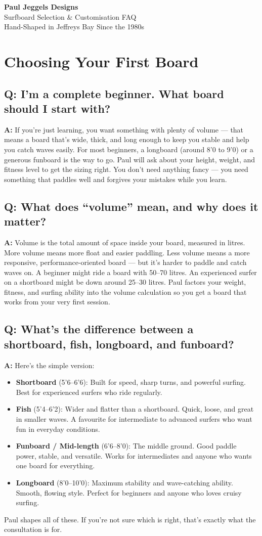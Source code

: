 \documentclass[11pt,a4paper]{article}
\newcommand{\question}[1]{\subsection*{Q: #1}}
\newcommand{\answer}{\noindent\textbf{A:} }
\begin{document}
\begin{center}
{\LARGE\bfseries\color{pjdnavy} Paul Jeggels Designs}\\[6pt]
{\Large\color{pjdnavy} Surfboard Selection \& Customisation FAQ}\\[4pt]
{\small\color{gray} Hand-Shaped in Jeffreys Bay Since the 1980s}
\end{center}

\vspace{1em}

\section{Choosing Your First Board}

\question{I'm a complete beginner. What board should I start with?}
\answer If you're just learning, you want something with plenty of volume --- that means a board that's wide, thick, and long enough to keep you stable and help you catch waves easily. For most beginners, a longboard (around 8'0 to 9'0) or a generous funboard is the way to go. Paul will ask about your height, weight, and fitness level to get the sizing right. You don't need anything fancy --- you need something that paddles well and forgives your mistakes while you learn.

\question{What does ``volume'' mean, and why does it matter?}
\answer Volume is the total amount of space inside your board, measured in litres. More volume means more float and easier paddling. Less volume means a more responsive, performance-oriented board --- but it's harder to paddle and catch waves on. A beginner might ride a board with 50--70 litres. An experienced surfer on a shortboard might be down around 25--30 litres. Paul factors your weight, fitness, and surfing ability into the volume calculation so you get a board that works from your very first session.

\question{What's the difference between a shortboard, fish, longboard, and funboard?}
\answer Here's the simple version:
\begin{itemize}[leftmargin=1.5em]
    \item \textbf{Shortboard} (5'6--6'6): Built for speed, sharp turns, and powerful surfing. Best for experienced surfers who ride regularly.
    \item \textbf{Fish} (5'4--6'2): Wider and flatter than a shortboard. Quick, loose, and great in smaller waves. A favourite for intermediate to advanced surfers who want fun in everyday conditions.
    \item \textbf{Funboard / Mid-length} (6'6--8'0): The middle ground. Good paddle power, stable, and versatile. Works for intermediates and anyone who wants one board for everything.
    \item \textbf{Longboard} (8'0--10'0): Maximum stability and wave-catching ability. Smooth, flowing style. Perfect for beginners and anyone who loves cruisy surfing.
\end{itemize}
Paul shapes all of these. If you're not sure which is right, that's exactly what the consultation is for.
\end{document}
